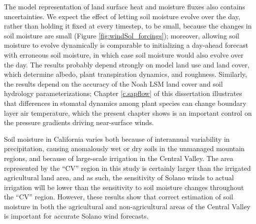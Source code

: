 The model representation of land surface heat and moisture fluxes also contains uncertainties.  We expect the effect of letting soil moisture evolve over the day, rather than holding it fixed at every timestep, to be small, because the changes in soil moisture are small (Figure \ref{fig:windSol_forcings}); moreover, allowing soil moisture to evolve dynamically is comparable to initializing a day-ahead forecast with erroneous soil moisture, in which case soil moisture would also evolve over the day.  The results probably depend strongly on model land use and land cover, which determine albedo, plant transpiration dynamics, and roughness.  Similarly, the results depend on the accuracy of the Noah LSM land cover and soil hydrology parameterizations; Chapter \ref{c.sapflow} of this dissertation illustrates that differences in stomatal dynamics among plant species can change boundary layer air temperature, which the present chapter shows is an important control on the pressure gradients driving near-surface winds.


Soil moisture in California varies both because of interannual variability in precipitation, causing anomalously wet or dry soils in the unmanaged mountain regions, and because of large-scale irrigation in the Central Valley.  The area represented by the ``CV'' region in this study is certainly larger than the irrigated agricultural land area, and as such, the sensitivity of Solano winds to actual irrigation will be lower than the sensitivity to soil moisture changes throughout the ``CV'' region.  However, these results show that correct estimation of soil moisture in both the agricultural and non-agricultural areas of the Central Valley is important for accurate Solano wind forecasts.  

